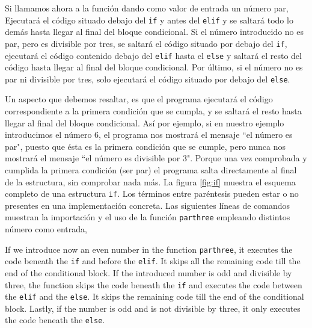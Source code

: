 \begin{paracol}{2}
Si llamamos ahora a la función dando como valor de entrada un número par, Ejecutará el código situado debajo del \texttt{if} y antes del \texttt{elif} y se saltará todo lo demás hasta llegar al final del bloque condicional. Si el número introducido no es par, pero es divisible por tres, se saltará el código situado por debajo del \texttt{if}, ejecutará el código contenido debajo del \texttt{elif} hasta el \texttt{else} y saltará el resto del código hasta llegar al final del bloque condicional. Por último, si el número no es par ni divisible por tres, solo ejecutará el código situado por debajo del \texttt{else}.

Un aspecto que debemos resaltar, es que el programa ejecutará el código correspondiente a la primera condición que se cumpla, y se saltará el resto hasta llegar al final del bloque condicional. Así por ejemplo, si en nuestro ejemplo introducimos el número $6$, el programa nos mostrará el mensaje ``el número es par", puesto que ésta es la primera condición que se cumple, pero nunca nos mostrará el mensaje ``el número es divisible por 3". Porque una vez comprobada y cumplida la primera condición (ser par) el programa salta directamente al final de la estructura, sin comprobar nada más. La figura \ref{fig:if} muestra el esquema completo de una estructura \texttt{if}. Los términos entre paréntesis pueden estar o no presentes en una implementación concreta. Las siguientes líneas de comandos muestran la importación y el uso de la función \texttt{parthree} empleando distintos número como entrada,

\switchcolumn
If we introduce now an even number in the function \texttt{parthree}, it executes the code beneath the \texttt{if} and before the \texttt{elif}. It skips all the remaining code till the end of the conditional block. If the introduced number is odd and divisible by three, the function skips the code beneath the \texttt{if} and executes the code between the \texttt{elif} and the \texttt{else}. It skips the remaining code till the end of the conditional block. Lastly, if the number is odd and is not divisible by three, it only executes the code beneath the \texttt{else}.


\end{paracol}
